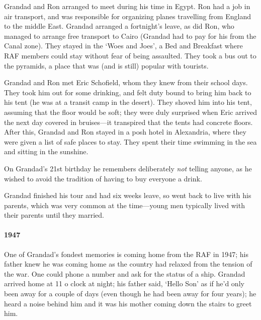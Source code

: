 Grandad and Ron arranged to meet during his time in Egypt. Ron had a job
in air transport, and was responsible for organizing planes travelling from England
to the middle East. Grandad arranged a fortnight's leave, as did Ron, who
managed to arrange free transport to Cairo (Grandad had to pay for his from
the Canal zone). They stayed in the `Woes and Joes', a Bed and Breakfast where RAF members
could stay without fear of being assaulted. They took a bus out to the pyramids, a place
that was (and is still) popular with tourists.

Grandad and Ron met Eric Schofield, whom they knew from their school days. They
took him out for some drinking, and felt duty bound to bring him back to his tent (he was
at a transit camp in the desert). They shoved him into his tent, assuming that
the floor would be soft; they were duly surprised when Eric arrived the next day
covered in bruises---it transpired that the tents had concrete floors. After this,
Grandad and Ron stayed in a posh hotel in Alexandria, where they were given
a list of safe places to stay. They spent their time swimming in the sea
and sitting in the sunshine.

\begin{figure}
	\centering
\end{figure}
On Grandad's 21st birthday he remembers deliberately \emph{not} telling anyone, as
he wished to avoid the tradition of having to buy everyone a drink.

Grandad finished his tour and had six weeks leave, so went back to live with his parents, which was
very common at the time---young men typically lived with their parents until they married.

\paragraph{1947} One of Grandad's fondest memories is coming home from the RAF in 1947; his father knew
he was coming home  as the country had relaxed from the tension of the war.
One could phone a number and ask for the status of a ship. Grandad arrived home at
11 o clock at night; his father said, `Hello Son' as if he'd only been away for
a couple of days (even though he had been away for four years); he heard a noise
behind him and it was his mother coming down the stairs to greet him.

